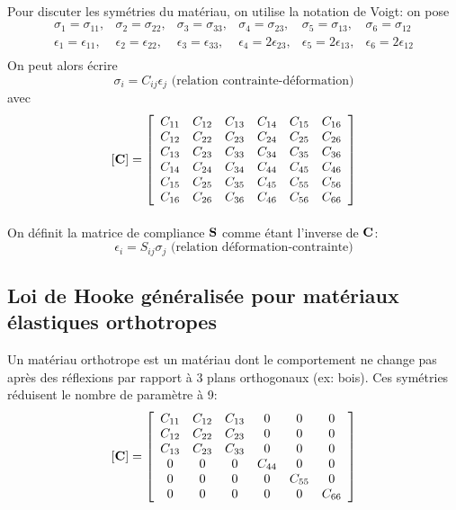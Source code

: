 \paragraph{}
Pour discuter les symétries du matériau, on utilise la notation de Voigt: on pose
$$\begin{array}{cccccc}
\sigma_1=\sigma_{11},&\sigma_2=\sigma_{22},&\sigma_3=\sigma_{33},&\sigma_4=\sigma_{23},&\sigma_5=\sigma_{13},&\sigma_6=\sigma_{12}\\
\epsilon_1=\epsilon_{11},&\epsilon_2=\epsilon_{22},&\epsilon_3=\epsilon_{33},&\epsilon_4=2\epsilon_{23},&\epsilon_5=2\epsilon_{13},&\epsilon_6=2\epsilon_{12}\\
\end{array}$$
On peut alors écrire $$\boxed{\sigma_i=C_{ij}\epsilon_{j}\text{ (relation contrainte-déformation)}}$$ avec
$$[\textbf{C}]=
\left[
\begin{array}{cccccc}
C_{11}&C_{12}&C_{13}&C_{14}&C_{15}&C_{16}\\
C_{12}& C_{22}&C_{23}&C_{24}&C_{25}&C_{26}\\
C_{13}&C_{23} &C_{33}&C_{34}&C_{35}&C_{36}\\
C_{14}&C_{24}&C_{34} &C_{44}&C_{45}&C_{46}\\
C_{15}&C_{25} &C_{35} &C_{45} &C_{55}&C_{56}\\
C_{16}&C_{26} &C_{36}&C_{46} &C_{56}&C_{66}\\
\end{array}\right]$$
\paragraph{}
On définit la matrice de compliance $\textbf{S}$ comme étant l'inverse de $\textbf{C}$: $$\boxed{\epsilon_{i}=S_{ij}\sigma_j \text{ (relation déformation-contrainte)}}$$
\subsection{Loi de Hooke généralisée pour matériaux élastiques orthotropes}
Un matériau orthotrope est un matériau dont le comportement ne change pas après des réflexions par rapport à 3 plans orthogonaux (ex: bois). Ces symétries réduisent le nombre de paramètre à 9:
$$[\textbf{C}]=
\left[
\begin{array}{cccccc}
C_{11}&C_{12}&C_{13}&0&0&0\\
C_{12}& C_{22}&C_{23}&0&0&0\\
C_{13}&C_{23} &C_{33}&0&0&0\\
0&0&0 &C_{44}&0&0\\
0&0 &0 &0 &C_{55}&0\\
0&0 &0&0 &0&C_{66}\\
\end{array}\right]$$
